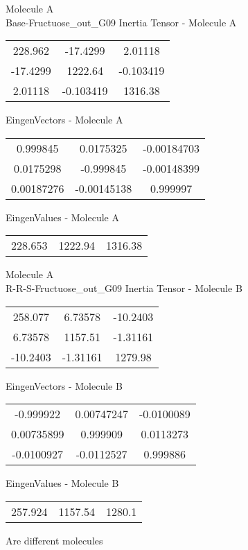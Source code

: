 \newpage
\begin{multicols}{2}
\begin{center}
Molecule A \\ 
Base-Fructuose_out_G09
Inertia Tensor - Molecule A \\
\vtab
\begin{tabular}{|c c c|}
228.962	 & 	-17.4299	 & 	2.01118	 \\
-17.4299	 & 	1222.64	 & 	-0.103419	 \\
2.01118	 & 	-0.103419	 & 	1316.38
\end{tabular}

\vtab
 EingenVectors - Molecule A     \\
\vtab
\begin{tabular}{|c c c|}
0.999845	 & 	0.0175325	 & 	-0.00184703	 \\
0.0175298	 & 	-0.999845	 & 	-0.00148399	 \\
0.00187276	 & 	-0.00145138	 & 	0.999997
\end{tabular}

\vtab
 EingenValues - Molecule A     \\
\vtab
\begin{tabular}{|c c c|}
228.653	 & 	1222.94	 & 	1316.38
\end{tabular}
\columnbreak
Molecule A \\ 
R-R-S-Fructuose_out_G09
Inertia Tensor - Molecule B \\
\vtab
\begin{tabular}{|c c c|}
258.077	 & 	6.73578	 & 	-10.2403	 \\
6.73578	 & 	1157.51	 & 	-1.31161	 \\
-10.2403	 & 	-1.31161	 & 	1279.98
\end{tabular}

\vtab
 EingenVectors - Molecule B     \\
\vtab
\begin{tabular}{|c c c|}
-0.999922	 & 	0.00747247	 & 	-0.0100089	 \\
0.00735899	 & 	0.999909	 & 	0.0113273	 \\
-0.0100927	 & 	-0.0112527	 & 	0.999886
\end{tabular}

\vtab
 EingenValues - Molecule B     \\
\vtab
\begin{tabular}{|c c c|}
257.924	 & 	1157.54	 & 	1280.1
\end{tabular}
\textcolor{NavyBlue}{\large Are different molecules}
\end{center}
\end{multicols}
